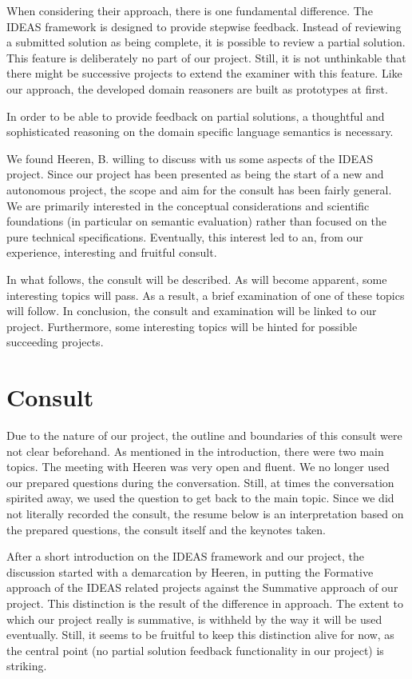 When considering their approach, there is one fundamental difference. The IDEAS
framework is designed to provide stepwise feedback. Instead of reviewing a
submitted solution as being complete, it is possible to review a partial solution. This
feature is deliberately no part of our project. Still, it is not unthinkable that there
might be successive projects to extend the \gls{examiner} with this feature.  
Like our approach, the developed domain reasoners are built as prototypes at first.

In order to be able to provide feedback on partial solutions, a thoughtful and 
sophisticated reasoning on the domain specific language semantics is necessary. 

We found Heeren, B. willing to discuss with us some aspects of the IDEAS project. Since
our project has been presented as being the 
start of a new and autonomous project, the scope and aim for
the consult has been fairly general. We are primarily interested in the 
conceptual considerations and scientific foundations (in particular on 
semantic evaluation) rather than focused on the pure technical specifications. 
Eventually, this interest led to an, from our experience, interesting and fruitful 
consult. 

In what follows, the consult will be described. As will become apparent, some interesting 
topics will pass. As a result, a brief examination of one of these topics will follow. 
In conclusion, the consult and examination will be linked to our project. Furthermore,
some interesting topics will be hinted for possible succeeding projects.

\section{Consult}
Due to the nature of our project, the outline and boundaries of this consult were not 
clear beforehand. As mentioned in the introduction, there were two main topics. 
The meeting with Heeren was very open and fluent. We no longer used our prepared 
questions during the conversation. Still, at times the conversation spirited away, 
we used the question to get back to the main topic. Since we did not literally
recorded the consult, the resume below is an interpretation based on the prepared 
questions, the consult itself and the keynotes taken.

After a short introduction on the IDEAS framework and our project, the discussion
started with a demarcation by Heeren, in putting the Formative approach of the 
IDEAS related projects against the Summative approach of our project. This 
distinction is the result of the difference in approach. The extent to which 
our project really is summative, is withheld by the way it will be used eventually. 
Still, it seems to be fruitful to keep this distinction alive for now, as the central 
point (no partial solution feedback functionality in our project) is striking.


